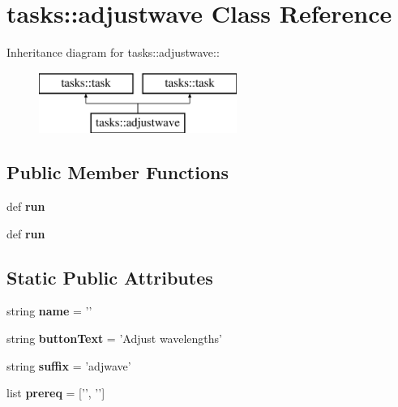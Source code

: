 \section{tasks::adjustwave Class Reference}
\label{classtasks_1_1adjustwave}
Inheritance diagram for tasks::adjustwave::\begin{figure}[H]
\begin{center}
\leavevmode
\includegraphics[height=2cm]{classtasks_1_1adjustwave}
\end{center}
\end{figure}
\subsection*{Public Member Functions}
\begin{CompactItemize}
\item 
def \textbf{run}\label{classtasks_1_1adjustwave_9621b453303f59a928546f58694201e2}

\item 
def \textbf{run}\label{classtasks_1_1adjustwave_9621b453303f59a928546f58694201e2}

\end{CompactItemize}
\subsection*{Static Public Attributes}
\begin{CompactItemize}
\item 
string \textbf{name} = '{\bfadjustwave}'\label{classtasks_1_1adjustwave_d2328aa56edd2173869ce6a65e506f4e}

\item 
string \textbf{button\-Text} = 'Adjust wavelengths'\label{classtasks_1_1adjustwave_05f4e1d2dc42a15e1973c552b20c3fda}

\item 
string \textbf{suffix} = 'adjwave'\label{classtasks_1_1adjustwave_6e46604461307022021de2eb12048deb}

\item 
list \textbf{prereq} = ['{\bfgetspecshift}', '{\bfaddwave}']\label{classtasks_1_1adjustwave_11e5a718bb52e59001ffdcb9d4d294a1}

\end{CompactItemize}


